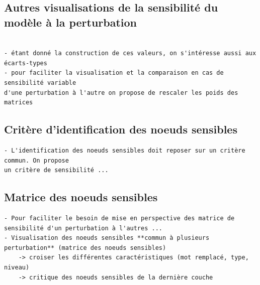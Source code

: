     \subsection{Autres visualisations de la sensibilité du modèle à la perturbation}
        \begin{verbatim}

- étant donné la construction de ces valeurs, on s'intéresse aussi aux écarts-types
- pour faciliter la visualisation et la comparaison en cas de sensibilité variable 
d'une perturbation à l'autre on propose de rescaler les poids des matrices
        \end{verbatim}

    \subsection{Critère d'identification des noeuds sensibles}
        \begin{verbatim}
- L'identification des noeuds sensibles doit reposer sur un critère commun. On propose
un critère de sensibilité ...
        \end{verbatim}

    \subsection{Matrice des noeuds sensibles}
        \begin{verbatim}
- Pour faciliter le besoin de mise en perspective des matrice de sensibilité d'un perturbation à l'autres ...
- Visualisation des noeuds sensibles **commun à plusieurs perturbation** (matrice des noeuds sensibles)
    -> croiser les différentes caractéristiques (mot remplacé, type, niveau)
    -> critique des noeuds sensibles de la dernière couche
        \end{verbatim}
